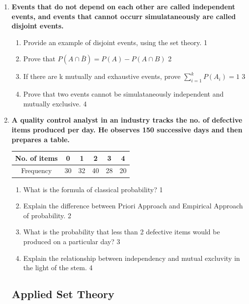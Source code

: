 \documentclass[a4paper,oneside]{book}
\begin{document}
\begin{enumerate}

     \item
	  \textbf{Events that do not depend on each other are called independent 
	  events, and events that cannot occurr simulataneously are called disjoint events.} 
  
  \begin{enumerate}
    \item
	Provide an example of disjoint events, using the set theory. \hfill 1
    \item
	Prove that $P(A\cap \bar B) = P(A) - P(A\cap B)$ \hfill 2
    \item  
	If there are k mutually and exhaustive events, prove 
	$\displaystyle \sum_{i=1}^k P(A_i) = 1$ \hfill 3
    \item
	Prove that two events cannot be simulataneously independent and mutually 
	exclusive. \hfill 4
  \end{enumerate}

 \item
	  \textbf{A quality control analyst in an industry tracks the no. 
	  of defective items produced per day. He observes 150 successive days 
	  and then prepares a table.} 
	  
	  \begin{table}[h]
	  \centering
\begin{tabular}{c|c|c|c|c|c} \hline
No. of items & 0 & 1 & 2 & 3 & 4 \\ \hline
Frequency & 30 & 32 & 40 & 28 & 20 \\ \hline
\end{tabular}
\end{table}
  
  \begin{enumerate}
    \item
	What is the formula of classical probability? \hfill 1
    \item
	Explain the difference between Priori Approach and Empirical Approach 
	of probability. \hfill 2
    \item  
	What is the probability that less than 2 defective items would be produced 
	on a particular day? \hfill 3
    \item
	Explain the relationship between independency and mutual excluvity in the 
	light of the stem. \hfill 4
  \end{enumerate}
  

  \subsection{Applied Set Theory}
  

\end{enumerate}
\end{document}
